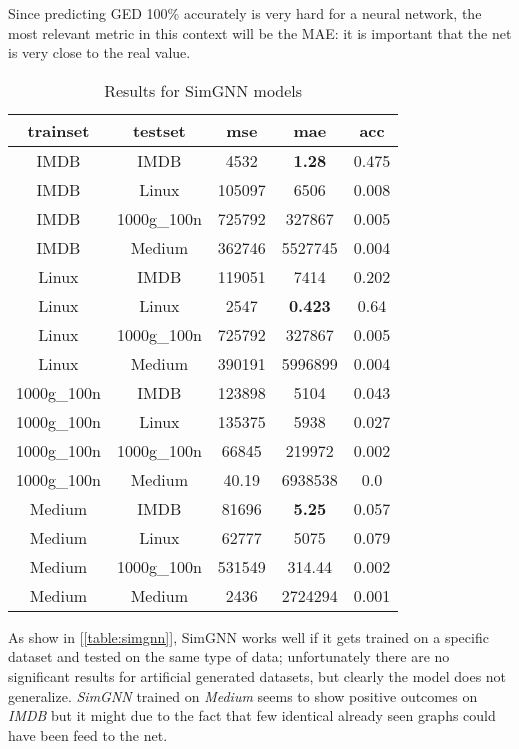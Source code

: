 \documentclass[../Thesis.tex]{subfiles}
\begin{document}
	Since predicting GED 100\% accurately is very hard for a neural network, the most relevant metric in this context will be the MAE: it is important that the net is very close to the real value.
	
	\begin{table}[H]
		\centering
		\setlength\tabcolsep{4pt}
		\renewcommand{\arraystretch}{1.2}
		\begin{tabular}{c|c|c|c|c}
			\toprule
			\textbf{trainset} & \textbf{testset} & \textbf{mse} & \textbf{mae} & \textbf{acc} \\
			\midrule
			IMDB & IMDB & 4532 & \textbf{1.28} & 0.475 \\
			IMDB & Linux & 105097 & 6506 & 0.008 \\
			IMDB & 1000g\_100n & 725792 & 327867 & 0.005 \\
			IMDB & Medium & 362746 & 5527745 & 0.004 \\ \midrule
			Linux & IMDB & 119051 & 7414 & 0.202 \\
			Linux & Linux & 2547 & \textbf{0.423} & 0.64 \\
			Linux & 1000g\_100n & 725792 & 327867 & 0.005 \\
			Linux & Medium & 390191 & 5996899 & 0.004 \\ \midrule
			1000g\_100n & IMDB & 123898 & 5104 & 0.043 \\
			1000g\_100n & Linux & 135375 & 5938 & 0.027 \\
			1000g\_100n & 1000g\_100n & 66845 & 219972 & 0.002 \\
			1000g\_100n & Medium & 40.19 & 6938538 & 0.0 \\ \midrule
			Medium & IMDB & 81696 & \textbf{5.25} & 0.057 \\
			Medium & Linux & 62777 & 5075 & 0.079 \\
			Medium & 1000g\_100n & 531549 & 314.44 & 0.002 \\
			Medium & Medium & 2436 & 2724294 & 0.001 \\
			\bottomrule
		\end{tabular}
		\caption{Results for SimGNN models}
		\label{table:simgnn}
	\end{table}
	
	As show in [\autoref{table:simgnn}], SimGNN works well if it gets trained on a specific dataset and tested on the same type of data; unfortunately there are no significant results for artificial generated datasets, but clearly the model does not generalize. \emph{SimGNN} trained on \emph{Medium} seems to show positive outcomes on \emph{IMDB} but it might due to the fact that few identical already seen graphs could have been feed to the net.
	
\end{document}
